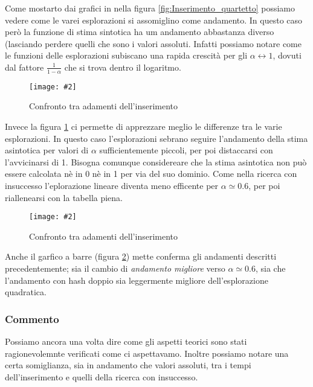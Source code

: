 \documentclass{article}
\newcommand{\image}[3][1]{
	\centering
	\texttt{[image: \#2]}
	\caption{#3}
}
\begin{document}
Come mostarto dai grafici in nella figura \ref{fig:Inserimento_quartetto} possiamo vedere come le varei esplorazioni si assomiglino come andamento. In questo caso però la funzione di stima sintotica ha um andamento abbastanza diverso (lasciando perdere quelli che sono i valori assoluti. Infatti possiamo notare come le funzioni delle esplorazioni subiscano una rapida crescità per gli $\alpha \longleftrightarrow 1$, dovuti dal fattore $\frac{1}{1 - \alpha}$ che si trova dentro il logaritmo. 

\begin{figure}[H]
\image[0.75]{Inserimento_Confronto_asintotico_scala_logaritmica}{Confronto tra adamenti dell'inserimento}
\label{fig:Inserimento_Confronto_asintotico_scala_logaritmica}
\end{figure}

Invece la figura \ref{fig:Inserimento_Confronto_asintotico_scala_logaritmica} ci permette di apprezzare meglio le differenze tra le varie esplorazioni. In questo caso l'esplorazioni sebrano seguire l'andamento della stima asintotica per valori di $\alpha$ sufficientemente piccoli, per poi distaccarsi con l'avvicinarsi di 1. Bisogna comunque considereare che la stima asintotica non può essere calcolata nè in 0 nè in 1 per via del suo dominio.
Come nella ricerca con insuccesso l'eplorazione lineare diventa meno efficente per $\alpha \simeq 0.6$, per poi riallenearsi con la tabella piena.

\begin{figure}[H]
\image[0.75]{Inserimento_Confronto_barre_scala_logaritmica}{Confronto tra adamenti dell'inserimento}
\label{fig:Inserimento_Confronto_barre_scala_logaritmica}
\end{figure}

Anche il garfico a barre (figura \ref{fig:Inserimento_Confronto_barre_scala_logaritmica}) mette conferma gli andamenti descritti precedentemente; sia il cambio di \emph{andamento migliore} verso $\alpha \simeq 0.6$, sia che l'andamento con hash doppio sia leggermente migliore dell'esplorazione quadratica.

\subsubsection{Commento}

Possiamo ancora una volta dire come gli aspetti teorici sono stati ragionevolemnte verificati come ci aspettavamo. Inoltre possiamo notare una certa somiglianza, sia in andamento che valori assoluti, tra i tempi dell'inserimento e quelli della ricerca con insuccesso.
\end{document}
